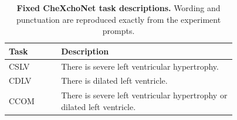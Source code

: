 \begin{table}[t]
\centering
\caption{\textbf{Fixed CheXchoNet task descriptions.} Wording and punctuation are reproduced exactly from the experiment prompts.}
\label{tab:supp-cardiac-prompts}
\footnotesize
\setlength{\tabcolsep}{4pt}
\renewcommand{\arraystretch}{1.15}
\begin{tabular}{@{}lp{0.77\linewidth}@{}}
\toprule
Task & Description \\
\midrule
CSLV & There is severe left ventricular hypertrophy. \\
CDLV & There is dilated left ventricle. \\
CCOM & There is severe left ventricular hypertrophy or dilated left ventricle. \\
\bottomrule
\end{tabular}
\end{table}
